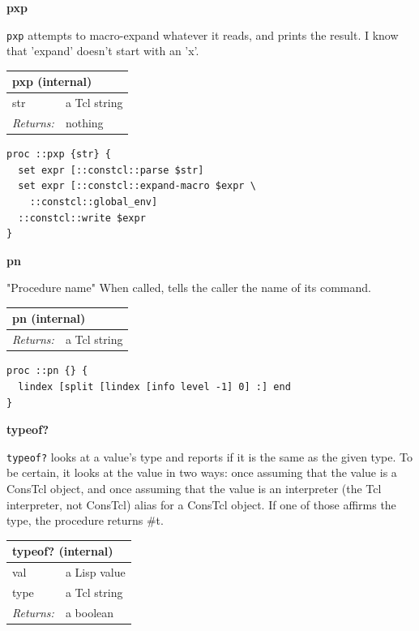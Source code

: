 \documentclass[twoside,9pt]{report}
\begin{document}
\textbf{pxp}


\texttt{pxp} attempts to macro-expand whatever it reads, and prints the result. I know that 'expand' doesn't start with an 'x'.

\begin{tabular}{ |l l| }
\hline
\multicolumn{2}{|l|}{pxp (internal)} \\
\hline
str & a Tcl string \\
\textit{Returns:} & nothing \\
\hline
\end{tabular}

\noindent\makebox[\linewidth]{\rule{\linewidth}{0.4pt}}
\begin{lstlisting}
proc ::pxp {str} {
  set expr [::constcl::parse $str]
  set expr [::constcl::expand-macro $expr \
    ::constcl::global_env]
  ::constcl::write $expr
}
\end{lstlisting}
\noindent\makebox[\linewidth]{\rule{\linewidth}{0.4pt}}

\textbf{pn}


"Procedure name" When called, tells the caller the name of its command.

\begin{tabular}{ |l l| }
\hline
\multicolumn{2}{|l|}{pn (internal)} \\
\hline
\textit{Returns:} & a Tcl string \\
\hline
\end{tabular}

\noindent\makebox[\linewidth]{\rule{\linewidth}{0.4pt}}
\begin{lstlisting}
proc ::pn {} {
  lindex [split [lindex [info level -1] 0] :] end
}
\end{lstlisting}
\noindent\makebox[\linewidth]{\rule{\linewidth}{0.4pt}}

\textbf{typeof?}


\texttt{typeof?} looks at a value's type and reports if it is the same as the given type. To be certain, it looks at the value in two ways: once assuming that the value is a ConsTcl object, and once assuming that the value is an interpreter (the Tcl interpreter, not ConsTcl) alias for a ConsTcl object. If one of those affirms the type, the procedure returns \#t.

\begin{tabular}{ |l l| }
\hline
\multicolumn{2}{|l|}{typeof? (internal)} \\
\hline
val & a Lisp value \\
type & a Tcl string \\
\textit{Returns:} & a boolean \\
\hline
\end{tabular}
\end{document}
